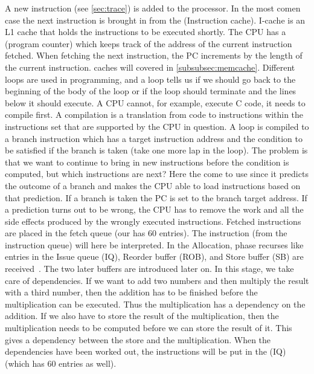 A new instruction (see \ref{sec:trace}) is added to the processor. In the most comen case the
next instruction is brought in from the  (Instruction cache). I-cache is
an L1 cache  that holds the instructions to be executed shortly.
The CPU has a  (program counter) which keeps track of the address of the current
instruction fetched. When fetching the next instruction, the PC
increments by the length of the current instruction. caches will covered in \ref{subsubsec:memcache}.
Different loops are used in programming, and a loop tells us if we should go
back to the beginning of the body of the loop or if the loop should terminate
and the lines below it should execute. A CPU cannot, for example, execute C code,
it needs to compile first. A compilation is a translation from code to instructions
within the instructions set that are supported by the CPU in question. A loop is compiled to a branch instruction which has a target instruction address
and the condition to be satisfied if the branch is taken (take one more lap in the
loop). The problem is that we want to continue to bring in new instructions before
the condition is computed, but which instructions are next? Here
the  come to use since it predicts the outcome of a branch and makes the CPU
able to load instructions based on that prediction. If a branch is taken the PC is set
to the branch target address. If a prediction turns out to be wrong, the CPU has to remove
the work and all the side effects produced by the wrongly executed instructions.
Fetched instructions are placed in the fetch queue (our has 60 entries).
The instruction (from the instruction queue) will here be interpreted. In the Allocation, phase recurses like entries in the Issue queue (IQ), Reorder buffer (ROB), and Store buffer (SB) are received~\cite{CPUbook}. The two later buffers are introduced later on.
In this stage, we take care of dependencies. If we want to add two numbers and
then multiply the result with a third number, then the addition has to be finished
before the multiplication can be executed. Thus the multiplication has a dependency
on the addition. If we also have to store the result of the multiplication, then the
multiplication needs to be computed before we can store the result of it. This gives a
dependency between the store and the multiplication. When the dependencies have
been worked out, the instructions will be put in the  (IQ) (which
has 60 entries as well).

